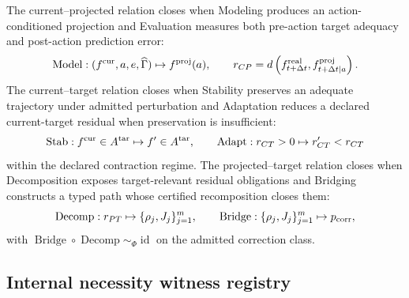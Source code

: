 \documentclass[11pt]{article}
\newcommand{\Model}{\operatorname{Model}}
\newcommand{\Stab}{\operatorname{Stab}}
\newcommand{\Adapt}{\operatorname{Adapt}}
\newcommand{\Decomp}{\operatorname{Decomp}}
\newcommand{\Bridge}{\operatorname{Bridge}}
\begin{document}
The current--projected relation closes when Modeling produces an action-conditioned projection and Evaluation measures both pre-action target adequacy and post-action prediction error:
\begin{equation}
\Model:(f^{\rm cur},a,e,\widehat\Gamma)\mapsto f^{\rm proj}(a),\qquad
r_{CP}=d\left(f^{\rm real}_{t+\Delta t},f^{\rm proj}_{t+\Delta t\mid a}\right).
\end{equation}
The current--target relation closes when Stability preserves an adequate trajectory under admitted perturbation and Adaptation reduces a declared current-target residual when preservation is insufficient:
\begin{equation}
\Stab:f^{\rm cur}\in A^{\rm tar}\mapsto f'\in A^{\rm tar},\qquad
\Adapt:r_{CT}>0\mapsto r'_{CT}<r_{CT}
\end{equation}
within the declared contraction regime. The projected--target relation closes when Decomposition exposes target-relevant residual obligations and Bridging constructs a typed path whose certified recomposition closes them:
\begin{equation}
\Decomp:r_{PT}\mapsto\{\rho_j,J_j\}_{j=1}^{m},\qquad
\Bridge:\{\rho_j,J_j\}_{j=1}^{m}\mapsto p_{\rm corr},
\end{equation}
with $\Bridge\circ\Decomp\sim_\Phi\operatorname{id}$ on the admitted correction class.

\subsection{Internal necessity witness registry}
\end{document}
